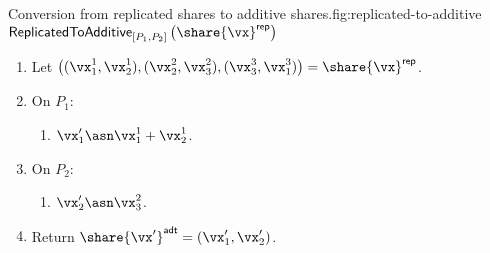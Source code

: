 \begin{Boxfig}{Conversion from replicated shares to additive shares.}{fig:replicated-to-additive}
  {$\mathsf{ReplicatedToAdditive}_{[P_1, P_2]}\left( \share{\vx}^{\mathsf{rep}} \right)$}

  \begin{enumerate}

  \item Let $\left( (\vx_1^1, \vx_2^1), (\vx_2^2, \vx_3^2), (\vx_3^3, \vx_1^3) \right) = \share{\vx}^{\mathsf{rep}}$.

  \item On $P_1$:
    \begin{enumerate}
    \item $\vx'_1 \asn \vx^1_1 + \vx^1_2$.
    \end{enumerate}

  \item On $P_2$:
    \begin{enumerate}
    \item $\vx'_2 \asn \vx^2_3$.
    \end{enumerate}

  \item Return $\share{\vx'}^{\mathsf{adt}} = (\vx'_1, \vx'_2)$.
\end{enumerate}
\end{Boxfig}








